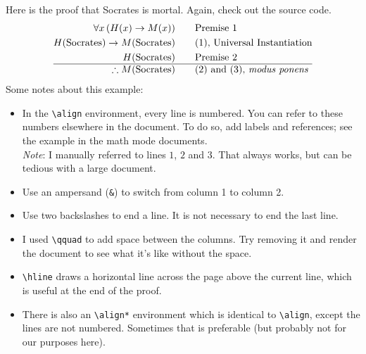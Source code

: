 \documentclass{article}
\begin{document}
Here is the proof that Socrates is mortal. Again, check out the source code.
\begin{align}
  \forall x\,(H(x)\to M(x)) & \qquad\textrm{Premise 1}\\
  H({\rm Socrates})\to M({\rm Socrates}) & \qquad\textrm{(1), Universal
  Instantiation}\\
  H({\rm Socrates}) & \qquad\textrm{Premise 2}\\ \hline
  \therefore M({\rm Socrates}) & \qquad\textrm{(2) and (3), \emph{modus ponens}}
\end{align}
\newpage
Some notes about this example:
\begin{itemize}
  \item In the {\tt \textbackslash align} environment, every line is numbered.
  You can refer to these numbers elsewhere in the document. To do so, add labels
  and references; see the example in the math mode documents.\\
  \emph{Note}\/: I manually referred to lines $1$, $2$ and $3$. That always
  works, but can be tedious with a large document.
  \item Use an ampersand ({\tt \&}) to switch from column 1 to column 2.
  \item Use two backslashes to end a line. It is not necessary to end the last
  line.
  \item I used {\tt \textbackslash qquad} to add space between the columns. Try
  removing it and render the document to see what it's like without the space.
  \item {\tt \textbackslash hline} draws a horizontal line across the page above
  the current line, which is useful at the end of the proof.
  \item There is also an {\tt \textbackslash align*} environment which is
  identical to {\tt \textbackslash align}, except the lines are not numbered.
  Sometimes that is preferable (but probably not for our purposes here).
\end{itemize}
\end{document}
